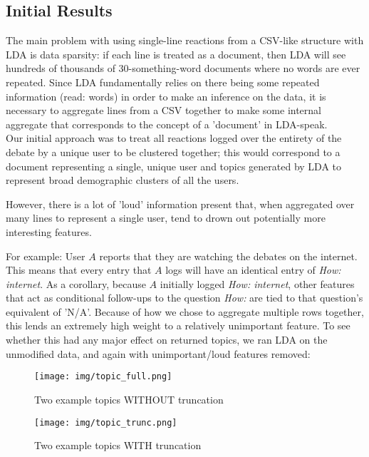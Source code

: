 \subsection{Initial Results}
The main problem with using single-line reactions from a CSV-like structure with LDA is data sparsity: if each line is treated as a document, then LDA will see hundreds of thousands of 30-something-word documents where no words are ever repeated. Since LDA fundamentally relies on there being some repeated information (read: words) in order to make an inference on the data, it is necessary to aggregate lines from a CSV together to make some internal aggregate that corresponds to the concept of a 'document' in LDA-speak.\\

Our initial approach was to treat all reactions logged over the entirety of the debate by a unique user to be clustered together; this would correspond to a document representing a single, unique user and topics generated by LDA to represent broad demographic clusters of all the users.

However, there is a lot of 'loud' information present that, when aggregated over many lines to represent a single user, tend to drown out potentially more interesting features.

For example: User $A$ reports that they are watching the debates on the internet. This means that every entry that $A$ logs will have an identical entry of \emph{How: internet}. As a corollary, because $A$ initially logged \emph{How: internet}, other features that act as conditional follow-ups to the question \emph{How: } are tied to that question's equivalent of 'N/A'. Because of how we chose to aggregate multiple rows together, this lends an extremely high weight to a relatively unimportant feature. To see whether this had any major effect on returned topics, we ran LDA on the unmodified data, and again with unimportant/loud features removed:\\

\begin{figure}[H]
\centering
\texttt{[image: img/topic\_full.png]}
\caption{Two example topics WITHOUT truncation}
\texttt{[image: img/topic\_trunc.png]}
\caption{Two example topics WITH truncation}
\end{figure}


